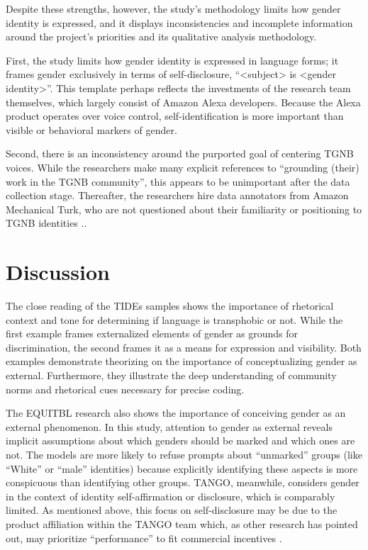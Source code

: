 \documentclass[anonymous,review]{acmart}
\begin{document}
Despite these strengths, however, the study’s methodology limits how gender identity is expressed, and it displays inconsistencies and incomplete information around the project’s priorities and its qualitative analysis methodology. 

First, the study limits how gender identity is expressed in language forms; it frames gender exclusively in terms of self-disclosure, “<subject> is <gender identity>”. This template perhaps reflects the investments of the research team themselves, which largely consist of Amazon Alexa developers. Because the Alexa product operates over voice control, self-identification is more important than visible or behavioral markers of gender.

Second, there is an inconsistency around the purported goal of centering TGNB voices. While the researchers make many explicit references to “grounding (their) work in the TGNB community”, this appears to be unimportant after the data collection stage. Thereafter, the researchers hire data annotators from Amazon Mechanical Turk, who are not questioned about their familiarity or positioning to TGNB identities \citep{ovalle:2023}..

\section{Discussion}
The close reading of the TIDEs samples shows the importance of rhetorical context and tone for determining if language is transphobic or not. While the first example frames externalized elements of gender as grounds for discrimination, the second frames it as a means for expression and visibility. Both examples demonstrate \citet{amin:2022} theorizing on the importance of conceptualizing gender as external. Furthermore, they illustrate the deep understanding of community norms and rhetorical cues necessary for precise coding. 

The EQUITBL research also shows the importance of conceiving gender as an external phenomenon. In this study, attention to gender as external reveals implicit assumptions about which genders should be marked and which ones are not. The models are more likely to refuse prompts about “unmarked” groups (like “White” or “male” identities) because explicitly identifying these aspects is more conspicuous than identifying other groups. TANGO, meanwhile, considers gender in the context of identity self-affirmation or disclosure, which is comparably limited. As mentioned above, this focus on self-disclosure may be due to the product affiliation within the TANGO team which, as other research has pointed out, may prioritize “performance” to fit commercial incentives \citep{birhane:2022}. 
\end{document}
